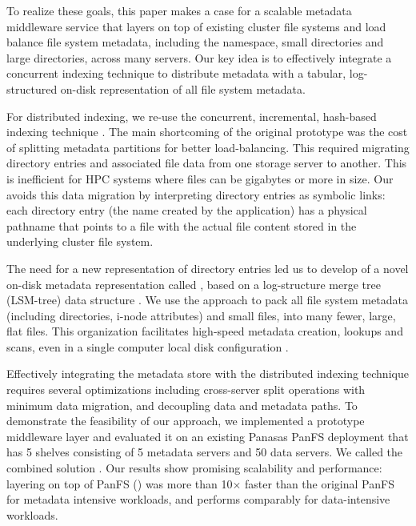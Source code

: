 To realize these goals, this paper makes a case for a scalable metadata
middleware service \sys that layers on top of existing cluster file systems and
load balance file system metadata, including the namespace, small
directories and large directories, across many servers.
Our key idea is to effectively integrate a concurrent indexing
technique to distribute metadata with a tabular, log-structured on-disk
representation of all file system metadata.

For distributed indexing, we re-use the concurrent, incremental, hash-based
\giga indexing technique \cite{GIGA11}.
The main shortcoming of the original \giga prototype was the cost of splitting
metadata partitions for better load-balancing. This required migrating
directory entries and associated file data \cite{GIGA11} from one storage
server to another.
This is inefficient for HPC systems where files can be gigabytes or more in
size. Our \sys avoids this data migration by interpreting directory
entries as symbolic links: each directory entry (the name created by the
application) has a physical pathname that points to a file
with the actual file content stored in the underlying cluster file system.

The need for a new representation of directory entries led us to develop
of a novel on-disk metadata representation called \tfs \cite{TableFS},
based on a log-structure merge tree (LSM-tree) data structure \cite{ONeil1996}.
We use the \tfs approach to pack all file system metadata
(including directories, i-node attributes) and small files,
into many fewer, large, flat files.
This organization facilitates high-speed metadata creation, lookups and scans,
even in a single computer local disk configuration \cite{TableFS}.

Effectively integrating the \tfs metadata store with the \giga distributed indexing
technique requires several optimizations including cross-server split operations
with minimum data migration, and decoupling data and metadata paths.
To demonstrate the feasibility of our approach,
we implemented a prototype middleware layer \sys and evaluated it
on an existing Panasas PanFS deployment \cite{PanFS} that has 5 shelves
consisting of 5 metadata servers and 50 data servers.
We called the combined solution \psys.
Our results show promising scalability and performance:
\sys layering on top of PanFS (\psys) was more than 10$\times$ faster than the original PanFS
for metadata intensive workloads, and performs comparably for data-intensive workloads.
